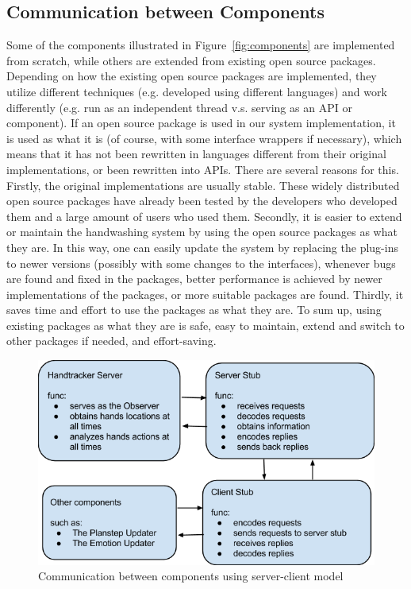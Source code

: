 \subsection{Communication between Components}

Some of the components illustrated in Figure~\ref{fig:components} are implemented from scratch, while others are extended from existing open source packages. Depending on how the existing open source packages are implemented, they utilize different techniques (e.g. developed using different languages) and work differently (e.g. run as an independent thread v.s. serving as an API or component). If an open source package is used in our system implementation, it is used as what it is (of course, with some interface wrappers if necessary), which means that it has not been rewritten in languages different from their original implementations, or been rewritten into APIs. There are several reasons for this. Firstly, the original implementations are usually stable. These widely distributed open source packages have already been tested by the developers who developed them and a large amount of users who used them. Secondly, it is easier to extend or maintain the handwashing system by using the open source packages as what they are. In this way, one can easily update the system by replacing the plug-ins to newer versions (possibly with some changes to the interfaces), whenever bugs are found and fixed in the packages, better performance is achieved by newer implementations of the packages, or more suitable packages are found. Thirdly, it saves time and effort to use the packages as what they are. To sum up, using existing packages as what they are is safe, easy to maintain, extend and switch to other packages if needed, and effort-saving.

\begin{figure}[h!]
\centering
\includegraphics[width=0.8\linewidth]{fig/communication.png}
\caption{Communication between components using server-client model}
\label{fig:communication}
\end{figure}

